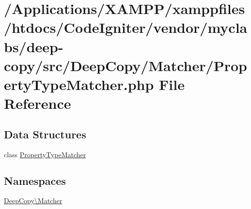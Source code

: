 \hypertarget{_property_type_matcher_8php}{}\section{/\+Applications/\+X\+A\+M\+P\+P/xamppfiles/htdocs/\+Code\+Igniter/vendor/myclabs/deep-\/copy/src/\+Deep\+Copy/\+Matcher/\+Property\+Type\+Matcher.php File Reference}
\label{_property_type_matcher_8php}
\subsection*{Data Structures}
\begin{DoxyCompactItemize}
\item 
class \mbox{\hyperlink{class_deep_copy_1_1_matcher_1_1_property_type_matcher}{Property\+Type\+Matcher}}
\end{DoxyCompactItemize}
\subsection*{Namespaces}
\begin{DoxyCompactItemize}
\item 
 \mbox{\hyperlink{namespace_deep_copy_1_1_matcher}{Deep\+Copy\textbackslash{}\+Matcher}}
\end{DoxyCompactItemize}
